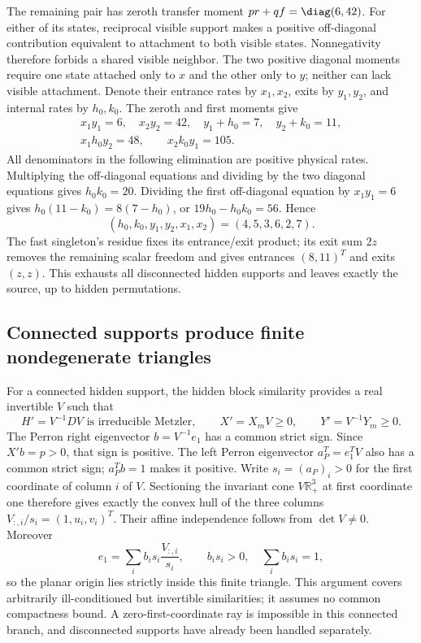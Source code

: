 The remaining pair has zeroth transfer moment
$pr+qf=\diag(6,42)$. For either of its states, reciprocal visible support
makes a positive off-diagonal contribution equivalent to attachment to
both visible states. Nonnegativity therefore forbids a shared visible
neighbor. The two positive diagonal moments require one state attached
only to $x$ and the other only to $y$; neither can lack visible
attachment. Denote their entrance rates by $x_1,x_2$, exits by $y_1,y_2$,
and internal rates by $h_0,k_0$. The zeroth and first moments give
\begin{gather}
 x_1y_1=6,\quad x_2y_2=42,\quad y_1+h_0=7,\quad y_2+k_0=11,\\
 x_1h_0y_2=48,\qquad x_2k_0y_1=105.
\end{gather}
All denominators in the following elimination are positive physical
rates. Multiplying the off-diagonal equations and dividing by the two
diagonal equations gives $h_0k_0=20$. Dividing the first off-diagonal
equation by $x_1y_1=6$ gives
$h_0(11-k_0)=8(7-h_0)$, or $19h_0-h_0k_0=56$. Hence
\begin{equation}
 (h_0,k_0,y_1,y_2,x_1,x_2)=(4,5,3,6,2,7).
\end{equation}
The fast singleton's residue fixes its entrance/exit product; its exit
sum $2z$ removes the remaining scalar freedom and gives entrances
$(8,11)^T$ and exits $(z,z)$. This exhausts all disconnected hidden
supports and leaves exactly the source, up to hidden permutations.

\subsection{Connected supports produce finite nondegenerate triangles}
For a connected hidden support, the hidden block similarity provides a
real invertible $V$ such that
\begin{equation}
 H'=V^{-1}DV\text{ is irreducible Metzler},\qquad
 X'=X_mV\ge0,\qquad Y'=V^{-1}Y_m\ge0.
\end{equation}
The Perron right eigenvector $b=V^{-1}e_1$ has a common strict sign.
Since $X'b=p>0$, that sign is positive. The left Perron eigenvector
$a_P^T=e_1^TV$ also has a common strict sign; $a_P^Tb=1$ makes it
positive. Write $s_i=(a_P)_i>0$ for the first coordinate of column $i$ of
$V$. Sectioning the invariant cone $V\mathbb R_+^3$ at first coordinate
one therefore gives exactly the convex hull of the three columns
$V_{:,i}/s_i=(1,u_i,v_i)^T$. Their affine independence follows from
$\det V\ne0$. Moreover
\begin{equation}
 e_1=\sum_i b_is_i\frac{V_{:,i}}{s_i},\qquad
 b_is_i>0,\quad\sum_i b_is_i=1,
\end{equation}
so the planar origin lies strictly inside this finite triangle. This
argument covers arbitrarily ill-conditioned but invertible similarities;
it assumes no common compactness bound. A zero-first-coordinate ray is
impossible in this connected branch, and disconnected supports have
already been handled separately.

